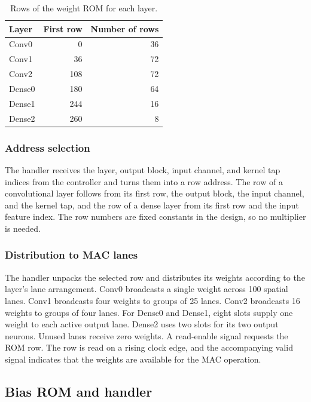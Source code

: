 \begin{table}[H]
    \centering
    \caption{Rows of the weight ROM for each layer.}
    \label{tab:weight-rows}
    \begin{tabular}{@{}lrr@{}}
        \toprule
        Layer & First row & Number of rows \\
        \midrule
        Conv0  &   0 & 36 \\
        Conv1  &  36 & 72 \\
        Conv2  & 108 & 72 \\
        Dense0 & 180 & 64 \\
        Dense1 & 244 & 16 \\
        Dense2 & 260 &  8 \\
        \bottomrule
    \end{tabular}
\end{table}

\subsubsection{Address selection}
The handler receives the layer, output block, input channel, and kernel tap indices from the controller and turns them into a row address. The row of a convolutional layer follows from its first row, the output block, the input channel, and the kernel tap, and the row of a dense layer from its first row and the input feature index. The row numbers are fixed constants in the design, so no multiplier is needed.

\subsubsection{Distribution to MAC lanes}
The handler unpacks the selected row and distributes its weights according to the layer's lane arrangement. Conv0 broadcasts a single weight across 100 spatial lanes. Conv1 broadcasts four weights to groups of 25 lanes. Conv2 broadcasts 16 weights to groups of four lanes. For Dense0 and Dense1, eight slots supply one weight to each active output lane. Dense2 uses two slots for its two output neurons. Unused lanes receive zero weights. A read-enable signal requests the ROM row. The row is read on a rising clock edge, and the accompanying valid signal indicates that the weights are available for the MAC operation.

\subsection{Bias ROM and handler}

